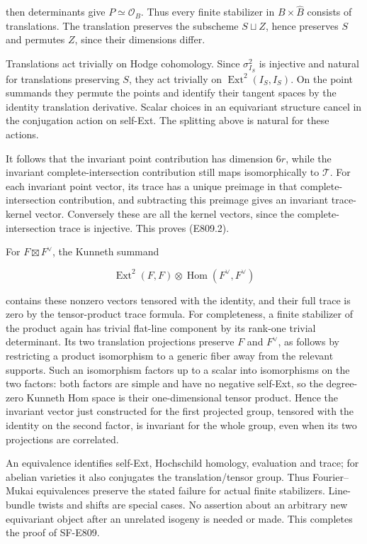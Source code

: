 then determinants give \(P\simeq\mathcal O_B\). Thus every finite
stabilizer in \(B\times\widehat B\) consists of translations. The
translation preserves the subscheme \(S\sqcup Z\), hence preserves \(S\)
and permutes \(Z\), since their dimensions differ.

Translations act trivially on Hodge cohomology. Since \(\sigma_{I_S}^2\)
is injective and natural for translations preserving \(S\), they act
trivially on \(\operatorname{Ext}^2(I_S,I_S)\). On the point summands
they permute the points and identify their tangent spaces by the
identity translation derivative. Scalar choices in an equivariant
structure cancel in the conjugation action on self-Ext. The splitting
above is natural for these actions.

It follows that the invariant point contribution has dimension \(6r\),
while the invariant complete-intersection contribution still maps
isomorphically to \(\mathcal T\). For each invariant point vector, its
trace has a unique preimage in that complete-intersection contribution,
and subtracting this preimage gives an invariant trace-kernel vector.
Conversely these are all the kernel vectors, since the
complete-intersection trace is injective. This proves (E809.2).

For \(F\boxtimes F^\vee\), the Kunneth summand

\[
 \operatorname{Ext}^2(F,F)\otimes\operatorname{Hom}(F^\vee,F^\vee)
\]

contains these nonzero vectors tensored with the identity, and their
full trace is zero by the tensor-product trace formula. For
completeness, a finite stabilizer of the product again has trivial
flat-line component by its rank-one trivial determinant. Its two
translation projections preserve \(F\) and \(F^\vee\), as follows by
restricting a product isomorphism to a generic fiber away from the
relevant supports. Such an isomorphism factors up to a scalar into
isomorphisms on the two factors: both factors are simple and have no
negative self-Ext, so the degree-zero Kunneth Hom space is their
one-dimensional tensor product. Hence the invariant vector just
constructed for the first projected group, tensored with the identity on
the second factor, is invariant for the whole group, even when its two
projections are correlated.

An equivalence identifies self-Ext, Hochschild homology, evaluation and
trace; for abelian varieties it also conjugates the translation/tensor
group. Thus Fourier--Mukai equivalences preserve the stated failure for
actual finite stabilizers. Line-bundle twists and shifts are special
cases. No assertion about an arbitrary new equivariant object after an
unrelated isogeny is needed or made. This completes the proof of
SF-E809.

